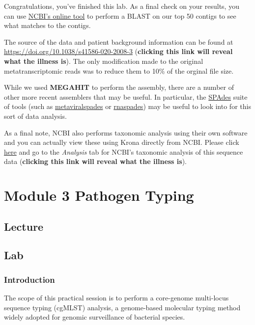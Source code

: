 \documentclass[
]{book}
\begin{document}
Congratulations, you've finished this lab. As a final check on your results, you can use \href{https://blast.ncbi.nlm.nih.gov/Blast.cgi}{NCBI's online tool} to perform a BLAST on our top 50 contigs to see what matches to the contigs.

The source of the data and patient background information can be found at \url{https://doi.org/10.1038/s41586-020-2008-3} (\textbf{clicking this link will reveal what the illness is}). The only modification made to the original metatranscriptomic reads was to reduce them to 10\% of the orginal file size.

While we used \textbf{MEGAHIT} to perform the assembly, there are a number of other more recent assemblers that may be useful. In particular, the \href{https://cab.spbu.ru/software/spades/}{SPAdes} suite of tools (such as \href{https://doi.org/10.1093/bioinformatics/btaa490}{metaviralspades} or \href{https://doi.org/10.1093/gigascience/giz100}{rnaspades}) may be useful to look into for this sort of data analysis.

As a final note, NCBI also performs taxonomic analysis using their own software and you can actually view these using Krona directly from NCBI. Please click \href{https://trace.ncbi.nlm.nih.gov/Traces/sra/?run=SRR10971381}{here} and go to the \emph{Analysis} tab for NCBI's taxonomic analysis of this sequence data (\textbf{clicking this link will reveal what the illness is}).

\chapter{Module 3 Pathogen Typing}\label{module-3-pathogen-typing}

\section{Lecture}\label{lecture-2}

\section{Lab}\label{lab-2}

\subsection{Introduction}\label{introduction}

The scope of this practical session is to perform a core-genome multi-locus sequence typing (cgMLST) analysis, a genome-based molecular typing method widely adopted for genomic surveillance of bacterial species.
\end{document}
